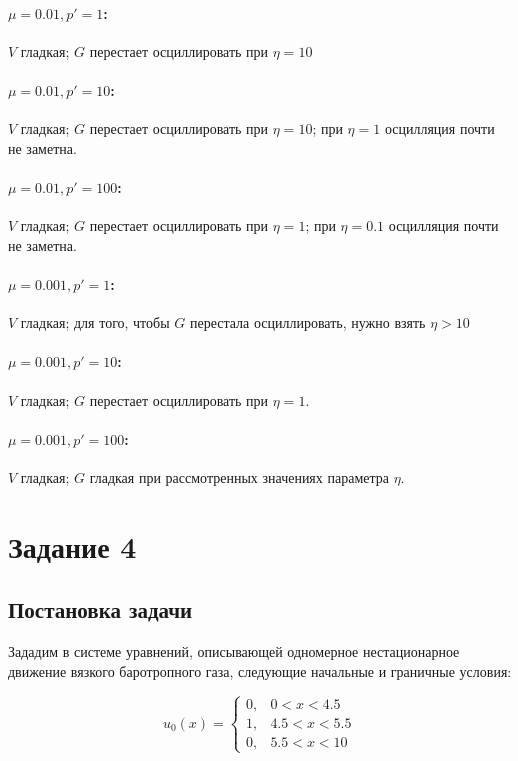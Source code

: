 \documentclass[12pt]{article}
\begin{document}
\paragraph{$\mu = 0.01, p' = 1$:}
$V$ гладкая; $G$ перестает осциллировать при $\eta = 10$
\paragraph{$\mu = 0.01, p' = 10$:}
$V$ гладкая; $G$ перестает осциллировать при $\eta = 10$; при $\eta = 1$ осцилляция почти не заметна.
\paragraph{$\mu = 0.01, p' = 100$:}
$V$ гладкая; $G$ перестает осциллировать при $\eta = 1$; при $\eta = 0.1$ осцилляция почти не заметна.
\paragraph{$\mu = 0.001, p' = 1$:}
$V$ гладкая; для того, чтобы $G$ перестала осциллировать, нужно взять $\eta > 10$
\paragraph{$\mu = 0.001, p' = 10$:}
$V$ гладкая; $G$ перестает осциллировать при $\eta = 1$.
\paragraph{$\mu = 0.001, p' = 100$:}
$V$ гладкая; $G$ гладкая при рассмотренных значениях параметра $\eta$.

\section{Задание 4}

\subsection{Постановка задачи}

Зададим в системе уравнений, описывающей одномерное нестационарное движение вязкого баротропного газа, следующие начальные и граничные условия:

$$
u_0(x) = 
\begin{cases}
0{,} & 0 < x < 4.5 \\
1{,} & 4.5 < x < 5.5\\
0{,} & 5.5 < x < 10
\end{cases}
$$
\end{document}
